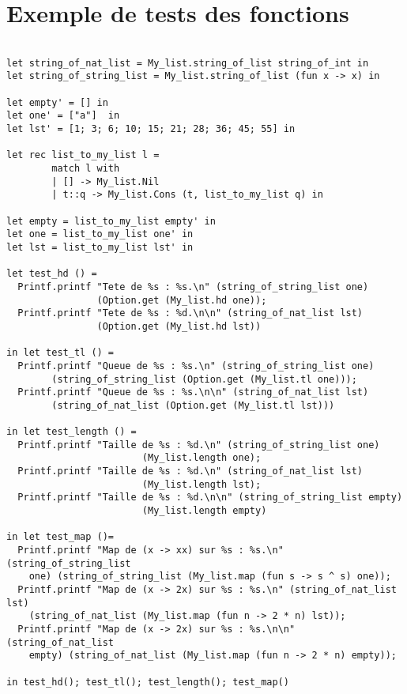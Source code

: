 \documentclass{article}
\begin{document}
\section{Exemple de tests des fonctions}
\begin{lstlisting}[language=caml]

let string_of_nat_list = My_list.string_of_list string_of_int in
let string_of_string_list = My_list.string_of_list (fun x -> x) in

let empty' = [] in
let one' = ["a"]  in
let lst' = [1; 3; 6; 10; 15; 21; 28; 36; 45; 55] in

let rec list_to_my_list l =
        match l with
        | [] -> My_list.Nil
        | t::q -> My_list.Cons (t, list_to_my_list q) in

let empty = list_to_my_list empty' in
let one = list_to_my_list one' in
let lst = list_to_my_list lst' in

let test_hd () =
  Printf.printf "Tete de %s : %s.\n" (string_of_string_list one) 
  				(Option.get (My_list.hd one));
  Printf.printf "Tete de %s : %d.\n\n" (string_of_nat_list lst) 
  				(Option.get (My_list.hd lst))

in let test_tl () =
  Printf.printf "Queue de %s : %s.\n" (string_of_string_list one) 
  		(string_of_string_list (Option.get (My_list.tl one)));
  Printf.printf "Queue de %s : %s.\n\n" (string_of_nat_list lst) 
  		(string_of_nat_list (Option.get (My_list.tl lst)))

in let test_length () =
  Printf.printf "Taille de %s : %d.\n" (string_of_string_list one) 
  						(My_list.length one);
  Printf.printf "Taille de %s : %d.\n" (string_of_nat_list lst) 
  						(My_list.length lst);
  Printf.printf "Taille de %s : %d.\n\n" (string_of_string_list empty) 
  						(My_list.length empty)

in let test_map ()=
  Printf.printf "Map de (x -> xx) sur %s : %s.\n" (string_of_string_list 
  	one) (string_of_string_list (My_list.map (fun s -> s ^ s) one));
  Printf.printf "Map de (x -> 2x) sur %s : %s.\n" (string_of_nat_list lst) 
  	(string_of_nat_list (My_list.map (fun n -> 2 * n) lst));
  Printf.printf "Map de (x -> 2x) sur %s : %s.\n\n" (string_of_nat_list 
  	empty) (string_of_nat_list (My_list.map (fun n -> 2 * n) empty));

in test_hd(); test_tl(); test_length(); test_map()

\end{lstlisting}
\end{document}
